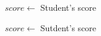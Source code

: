 \documentclass[16pt,a4paper]{article}
\begin{document}
    \begin{algorithm}[H]
        $score \leftarrow $ Student's score\;


        \BlankLine
        $score \gets$ Sutdent's score\; 

    \end{algorithm}
\end{document}
